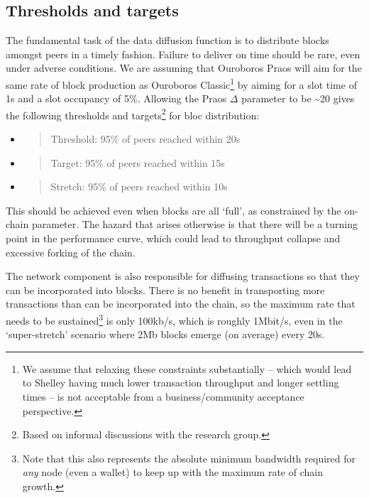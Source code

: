 \documentclass[11pt,a4paper]{article}
\begin{document}
\subsection{Thresholds and targets}
\label{thresholds-and-targets}

The fundamental task of the data diffusion function is to distribute
blocks amongst peers in a timely fashion. Failure to deliver on time
should be rare, even under adverse conditions. We are assuming that
Ouroboros Praos will aim for the same rate of block production as
Ouroboros Classic\footnote{We assume that relaxing these constraints
  substantially -- which would lead to Shelley having much lower
  transaction throughput and longer settling times -- is not acceptable
  from a business/community acceptance perspective.} by aiming for a
slot time of 1s and a slot occupancy of 5\%. Allowing the Praos $\Delta$
parameter to be \textasciitilde{}20 gives the following thresholds and
targets\footnote{Based on informal discussions with the research group.}
for bloc distribution:


\begin{itemize}
\item
  \begin{quote}
  Threshold: 95\% of peers reached within 20s
  \end{quote}
\item
  \begin{quote}
  Target: 95\% of peers reached within 15s
  \end{quote}
\item
  \begin{quote}
  Stretch: 95\% of peers reached within 10s
  \end{quote}
\end{itemize}

This should be achieved even when blocks are all `full', as constrained
by the on-chain parameter. The hazard that arises otherwise is that
there will be a turning point in the performance curve, which could lead
to throughput collapse and excessive forking of the chain.

The network component is also responsible for diffusing transactions so
that they can be incorporated into blocks. There is no benefit in
transporting more transactions than can be incorporated into the chain,
so the maximum rate that needs to be sustained\footnote{Note that this
  also represents the absolute minimum bandwidth required for \emph{any}
  node (even a wallet) to keep up with the maximum rate of chain growth.}
is only 100kb/s, which is roughly 1Mbit/s, even in the `super-stretch'
scenario where 2Mb blocks emerge (on average) every 20s.
\end{document}
